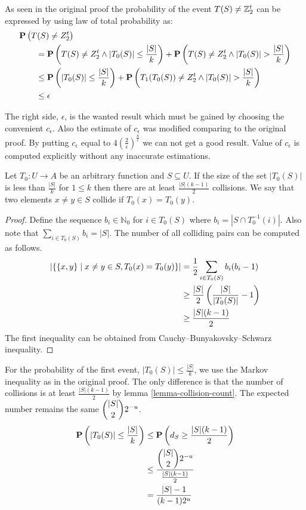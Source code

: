 As seen in the original proof the probability of the event $T(S) \neq \mathbb{Z}_{2}^{t}$ can be expressed by using law of total probability as:
\[
\begin{split}
& \mathbf{P}\left(T(S) \neq Z_2^t\right) \\
    & \qquad = \mathbf{P}\left(T(S) \neq Z_2^t \wedge |T_0(S)| \leq \frac{|S|}{k}\right) + \mathbf{P}\left(T(S) \neq Z_2^t \wedge |T_0(S)| > \frac{|S|}{k}\right) \\ 
    & \qquad \leq \mathbf{P}\left(|T_0(S)| \leq \frac{|S|}{k}\right) + \mathbf{P}\left(T_1(T_0(S)) \neq Z_2^t \wedge |T_0(S)| > \frac{|S|}{k}\right) \\
    & \qquad \leq \epsilon \\
\end{split}
\]

The right side, $\epsilon$, is the wanted result which must be gained by choosing the convenient $c_{\epsilon}$. Also the estimate of $c_{\epsilon}$ was modified comparing to the original proof. By putting $c_{\epsilon}$ equal to $4\left(\frac{2}{\epsilon}\right)^{\frac{8}{\epsilon}}$ we can not get a good result. Value of $c_{\epsilon}$ is computed explicitly without any inaccurate estimations.

\begin{lemma}
\label{lemma-collision-count}
Let $T_0: U \rightarrow A$ be an arbitrary function and $S \subseteq U$. If the size of the set $|T_0(S)|$ is less than $\frac{|S|}{k}$ for $1 \leq k$ then there are at least $\frac{|S|(k - 1)}{2}$ collisions. We say that two elements $x \neq y \in S$ collide if $T_0(x) = T_0(y)$.
\end{lemma} 
\begin{proof}
Define the sequence $b_i \in \mathbb{N}_0$ for $i \in T_0(S)$ where $b_i = \left|S \cap T_0^{-1}(i)\right|$. Also note that $\sum_{i \in T_0(S)} b_i = |S|$.
The number of all colliding pairs can be computed as follows.
\[
\begin{split}
|\{ \{x, y\} \mid x \neq y \in S, T_0(x) = T_0(y) \}| 
	& = \frac{1}{2} \sum_{i \in T_0(S)} b_i (b_i - 1) \\ 
	& \geq \frac{|S|}{2}\left(\frac{|S|}{|T_0(S)|} - 1\right) \\
	& \geq \frac{|S|(k - 1)}{2}
\end{split}
\]
The first inequality can be obtained from Cauchy–Bunyakovsky–Schwarz inequality.
\end{proof}

For the probability of the first event, $|T_0(S)| \leq \frac{|S|}{k}$, we use the Markov inequality as in the original proof. The only difference is that the number of collisions is at least $\frac{|S|(k - 1)}{2}$ by lemma \ref{lemma-collision-count}. The expected number remains the same $\dbinom{|S|}{2}2 ^ {-u}$.
\[
\begin{split}
\mathbf{P}\left(|T_0(S)| \leq \frac{|S|}{k}\right) 
	& \leq \mathbf{P}\left(d_S \geq \frac{|S|(k - 1)}{2}\right) \\
	& \leq \frac{\dbinom{|S|}{2}2 ^ {-u}}{\frac{|S|(k - 1)}{2}} \\
	& = \frac{|S| - 1}{(k - 1) 2^u} \\
\end{split}
\]

